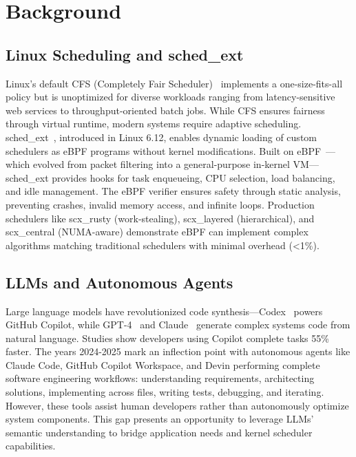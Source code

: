 \section{Background}
\label{sec:background}

\subsection{Linux Scheduling and sched\_ext}

Linux's default CFS (Completely Fair Scheduler)~\cite{wong2008cfs} implements a one-size-fits-all policy but is unoptimized for diverse workloads ranging from latency-sensitive web services to throughput-oriented batch jobs. While CFS ensures fairness through virtual runtime, modern systems require adaptive scheduling. sched\_ext~\cite{schedext2024}, introduced in Linux 6.12, enables dynamic loading of custom schedulers as eBPF programs without kernel modifications. Built on eBPF~\cite{mccanne1993bpf,gregg2019bpf}—which evolved from packet filtering into a general-purpose in-kernel VM—sched\_ext provides hooks for task enqueueing, CPU selection, load balancing, and idle management. The eBPF verifier ensures safety through static analysis, preventing crashes, invalid memory access, and infinite loops. Production schedulers like scx\_rusty (work-stealing), scx\_layered (hierarchical), and scx\_central (NUMA-aware) demonstrate eBPF can implement complex algorithms matching traditional schedulers with minimal overhead (<1\%).

\subsection{LLMs and Autonomous Agents}

Large language models have revolutionized code synthesis—Codex~\cite{chen2021codex} powers GitHub Copilot, while GPT-4~\cite{openai2023gpt4} and Claude~\cite{anthropic2024claude} generate complex systems code from natural language. Studies show developers using Copilot complete tasks 55\% faster. The years 2024-2025 mark an inflection point with autonomous agents like Claude Code, GitHub Copilot Workspace, and Devin performing complete software engineering workflows: understanding requirements, architecting solutions, implementing across files, writing tests, debugging, and iterating. However, these tools assist human developers rather than autonomously optimize system components. This gap presents an opportunity to leverage LLMs' semantic understanding to bridge application needs and kernel scheduler capabilities.

